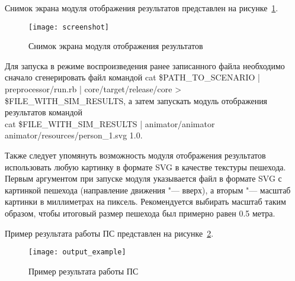 Снимок экрана модуля отображения результатов представлен на рисунке~\ref{sec:manual:launch:scheenshot}.

\begin{figure}[ht]
  \centering
  \texttt{[image: screenshot]}
  \caption{Снимок экрана модуля отображения результатов}
  \label{sec:manual:launch:scheenshot}
\end{figure}

Для запуска в режиме воспроизведения ранее записанного файла необходимо сначало сгенерировать файл командой
cat \$PATH\_TO\_SCENARIO \-|\- preprocessor/run.rb \-|\- core/target/release/core \->\- \$FILE\_WITH\_SIM\_RESULTS,
а затем запускать модуль отображения результатов командой \\
cat \$FILE\_WITH\_SIM\_RESULTS \-|\- animator/animator \\ animator/resources/person\_1.svg 1.0.

Также следует упомянуть возможность модуля отображения результатов использовать любую картинку в формате SVG в качестве текстуры пешехода.
Первым аргументом при запуске модуля указывается файл в формате SVG с картинкой пешехода (направление движения "--- вверх), а вторым "--- масштаб картинки в миллиметрах на пиксель.
Рекомендуется выбирать масштаб таким образом, чтобы итоговый размер пешехода был примерно равен 0.5 метра.

Пример результата работы ПС представлен на рисунке~\ref{sec:manual:launch:result_pic}.

\begin{figure}[ht]
  \texttt{[image: output\_example]}
  \caption{Пример результата работы ПС}
  \label{sec:manual:launch:result_pic}
\end{figure}
